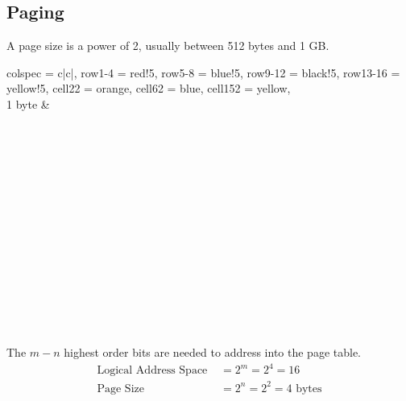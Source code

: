 \documentclass[a4paper]{article}
\begin{document}
\begin{multicols*}{2}
    \subsection*{Paging}
    A page size is a power of 2, usually between 512 bytes and 1 GB.
    \begin{multicols*}{2}
        \begin{minipage}{0.5\columnwidth}
            \begin{tblr}{
                    colspec = {c|c|},
                    row{1-4} = {red!5},
                    row{5-8} = {blue!5},
                    row{9-12} = {black!5},
                    row{13-16} = {yellow!5},
                    cell{2}{2} = {orange},
                    cell{6}{2} = {blue},
                    cell{15}{2} = {yellow},
                }
                 \\
                1 byte &  \\
                 \\
                 \\
                 \\
                 \\
                 \\
                 \\
                 \\
                 \\
                 \\
                 \\
                 \\
                 \\
                 \\
                 \\
            \end{tblr}
        \end{minipage}
        \columnbreak
        \begin{minipage}{1.5\columnwidth}
            The \(m-n\) highest order bits are needed to address into the page
            table.
            \begin{align*}
                \text{Logical Address Space } & = 2^m = 2^4 = 16              \\
                \text{Page Size}              & = 2^n = 2^2 = 4 \text{ bytes} \\
            \end{align*}


\end{minipage}
\end{multicols*}
\end{multicols*}
\end{document}
